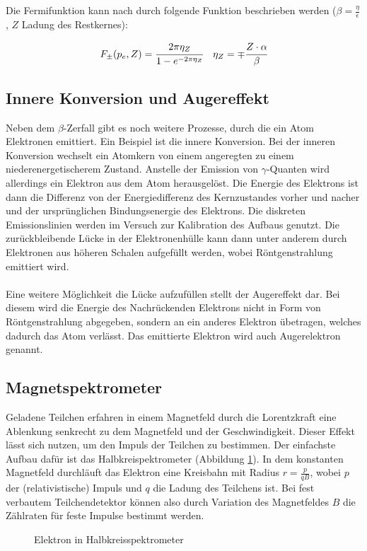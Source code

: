 Die Fermifunktion kann nach \cite{fermi} durch folgende Funktion beschrieben werden ($\beta = \frac{\eta}{\epsilon}$, $Z$ Ladung des Restkernes):

\begin{align}
F_\pm(p_e,Z) &= \cfrac{2\pi\eta_Z}{1-e^{-2\pi\eta_Z}} & \eta_Z = \mp \cfrac{Z\cdot \alpha}{\beta}
\label{equ:fermi}
\end{align}


\subsection{Innere Konversion und Augereffekt}
Neben dem $\beta$-Zerfall gibt es noch weitere Prozesse, durch die ein Atom Elektronen emittiert. Ein Beispiel ist die innere Konversion. Bei der inneren Konversion wechselt ein Atomkern von einem angeregten zu einem niederenergetischerem Zustand. Anstelle der Emission von $\gamma$-Quanten wird allerdings ein Elektron aus dem Atom herausgelöst. Die Energie des Elektrons ist dann die Differenz von der Energiedifferenz des Kernzustandes vorher und nacher und der ursprünglichen Bindungsenergie des Elektrons. Die diskreten Emissionslinien werden im Versuch zur Kalibration des Aufbaus genutzt. Die zurückbleibende Lücke in der Elektronenhülle kann dann unter anderem durch Elektronen aus höheren Schalen aufgefüllt werden, wobei Röntgenstrahlung emittiert wird.\\ \\
Eine weitere Möglichkeit die Lücke aufzufüllen stellt der Augereffekt dar. Bei diesem wird die Energie des Nachrückenden Elektrons nicht in Form von Röntgenstrahlung abgegeben, sondern an ein anderes Elektron übetragen, welches dadurch das Atom verlässt. Das emittierte Elektron wird auch Augerelektron genannt.

\subsection{Magnetspektrometer}
Geladene Teilchen erfahren in einem Magnetfeld durch die Lorentzkraft eine Ablenkung senkrecht zu dem Magnetfeld und der Geschwindigkeit. Dieser Effekt lässt sich nutzen, um den Impuls der Teilchen zu bestimmen. Der einfachste Aufbau dafür ist das Halbkreispektrometer (Abbildung \ref{fig:halbkreis}). In dem konstanten Magnetfeld durchläuft das Elektron eine Kreisbahn mit Radius $r=\frac{p}{qB}$, wobei $p$ der (relativistische) Impuls und $q$ die Ladung des Teilchens ist. Bei fest verbautem Teilchendetektor können also durch Variation des Magnetfeldes $B$ die Zählraten für feste Impulse bestimmt werden.
\begin{figure}[h]
  \centering
  \caption{Elektron in Halbkreisspektrometer}
  \label{fig:halbkreis}
\end{figure}

